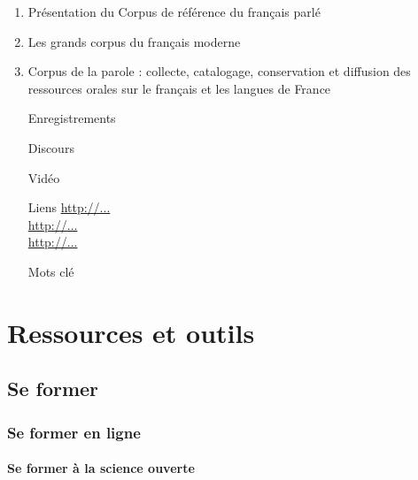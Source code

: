 \documentclass{book}
\begin{document}
\begin{enumerate}
    \item Présentation du Corpus de référence du français parlé \autocite{delic:halshs-01388193}
    \item Les grands corpus du français moderne \autocite{wissner:hal-03604977}
    \item Corpus de la parole : collecte, catalogage, conservation et diffusion des ressources orales sur le français et les langues de France \autocite{jacobson:halshs-01165884}
\end{enumerate}
\begin{enumerate}
	\item [Enregistrements]
	\item [Discours]
	\item[Vidéo]
\end{enumerate}

\begin{itemize}
    \item [Liens]
        \url{http://...}\\
        \url{http://...}\\
        \url{http://...}\\
    \item [Mots clé]
\end{itemize}


\chapter{Ressources et outils}


\section{Se former}

\subsection{Se former en ligne}

\subsubsection{Se former à la science ouverte}
\end{document}
